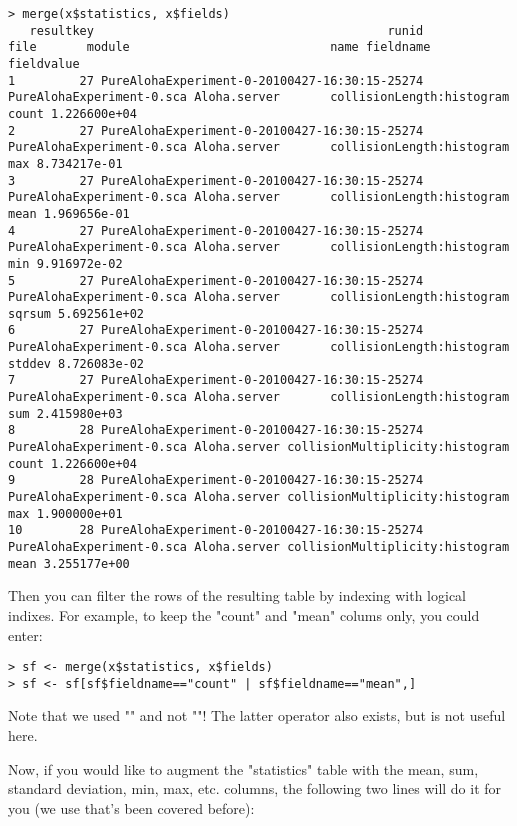 \begin{verbatim}
> merge(x$statistics, x$fields)
   resultkey                                         runid                      file       module                            name fieldname   fieldvalue
1         27 PureAlohaExperiment-0-20100427-16:30:15-25274 PureAlohaExperiment-0.sca Aloha.server       collisionLength:histogram     count 1.226600e+04
2         27 PureAlohaExperiment-0-20100427-16:30:15-25274 PureAlohaExperiment-0.sca Aloha.server       collisionLength:histogram       max 8.734217e-01
3         27 PureAlohaExperiment-0-20100427-16:30:15-25274 PureAlohaExperiment-0.sca Aloha.server       collisionLength:histogram      mean 1.969656e-01
4         27 PureAlohaExperiment-0-20100427-16:30:15-25274 PureAlohaExperiment-0.sca Aloha.server       collisionLength:histogram       min 9.916972e-02
5         27 PureAlohaExperiment-0-20100427-16:30:15-25274 PureAlohaExperiment-0.sca Aloha.server       collisionLength:histogram    sqrsum 5.692561e+02
6         27 PureAlohaExperiment-0-20100427-16:30:15-25274 PureAlohaExperiment-0.sca Aloha.server       collisionLength:histogram    stddev 8.726083e-02
7         27 PureAlohaExperiment-0-20100427-16:30:15-25274 PureAlohaExperiment-0.sca Aloha.server       collisionLength:histogram       sum 2.415980e+03
8         28 PureAlohaExperiment-0-20100427-16:30:15-25274 PureAlohaExperiment-0.sca Aloha.server collisionMultiplicity:histogram     count 1.226600e+04
9         28 PureAlohaExperiment-0-20100427-16:30:15-25274 PureAlohaExperiment-0.sca Aloha.server collisionMultiplicity:histogram       max 1.900000e+01
10        28 PureAlohaExperiment-0-20100427-16:30:15-25274 PureAlohaExperiment-0.sca Aloha.server collisionMultiplicity:histogram      mean 3.255177e+00
\end{verbatim}

Then you can filter the rows of the resulting table by indexing with logical indixes.
For example, to keep the "count" and "mean" colums only, you could enter:

\begin{verbatim}
> sf <- merge(x$statistics, x$fields)
> sf <- sf[sf$fieldname=="count" | sf$fieldname=="mean",]
\end{verbatim}

Note that we used "\ttt{|}" and not "\ttt{||}"! The latter operator also exists,
but is not useful here.

Now, if you would like to augment the "statistics" table with the mean, sum,
standard deviation, min, max, etc. columns, the following two lines will do it
for you (we use  that's been covered before):

